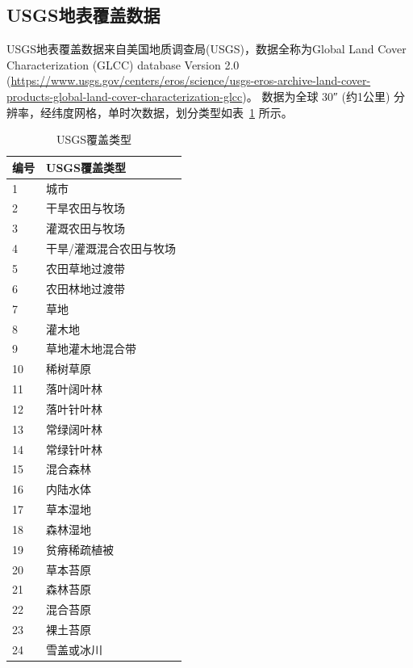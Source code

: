 \subsection{USGS地表覆盖数据}\label{USGS地表覆盖数据}
USGS地表覆盖数据来自美国地质调查局(USGS)，数据全称为Global Land Cover Characterization (GLCC) database Version 2.0 
(\url{https://www.usgs.gov/centers/eros/science/usgs-eros-archive-land-cover-products-global-land-cover-characterization-glcc})。
数据为全球 \ang{;;30} (约1公里) 分辨率，经纬度网格，单时次数据，划分类型如表~\ref{tab:USGS覆盖类型} 所示。
\begin{table}[htbp]
\centering
\caption{USGS覆盖类型}
\label{tab:USGS覆盖类型}
\begin{tabular}{@{}ll@{}}
\toprule
编号 & USGS覆盖类型     \\ \midrule
1  & 城市           \\
2  & 干旱农田与牧场      \\
3  & 灌溉农田与牧场      \\
4  & 干旱/灌溉混合农田与牧场 \\
5  & 农田草地过渡带      \\
6  & 农田林地过渡带      \\
7  & 草地           \\
8  & 灌木地          \\
9  & 草地灌木地混合带     \\
10 & 稀树草原         \\
11 & 落叶阔叶林        \\
12 & 落叶针叶林        \\
13 & 常绿阔叶林        \\
14 & 常绿针叶林        \\
15 & 混合森林         \\
16 & 内陆水体         \\
17 & 草本湿地         \\
18 & 森林湿地         \\
19 & 贫瘠稀疏植被       \\
20 & 草本苔原         \\
21 & 森林苔原         \\
22 & 混合苔原         \\
23 & 裸土苔原         \\
24 & 雪盖或冰川        \\ \bottomrule
\end{tabular}
\end{table}


